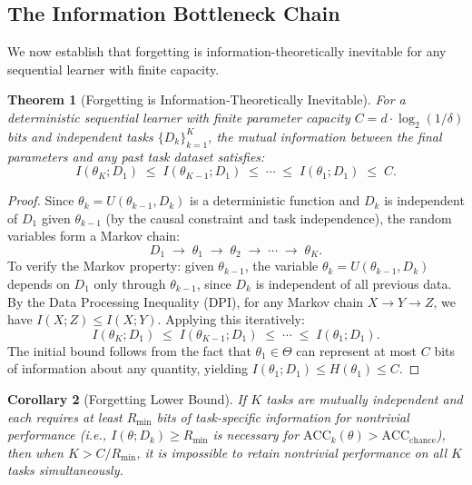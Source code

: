 \documentclass{article}
\newtheorem{theorem}{Theorem}
\newtheorem{corollary}[theorem]{Corollary}
\begin{document}
\subsection{The Information Bottleneck Chain}
\label{sec:bottleneck}

We now establish that forgetting is information-theoretically inevitable for any sequential learner with finite capacity.

\begin{theorem}[Forgetting is Information-Theoretically Inevitable]
\label{thm:bottleneck}
For a deterministic sequential learner with finite parameter capacity $C = d \cdot \log_2(1/\delta)$ bits and independent tasks $\{D_k\}_{k=1}^K$, the mutual information between the final parameters and any past task dataset satisfies:
\begin{equation}
\label{eq:dpi_chain}
    I(\theta_K; D_1) \;\leq\; I(\theta_{K-1}; D_1) \;\leq\; \cdots \;\leq\; I(\theta_1; D_1) \;\leq\; C.
\end{equation}
\end{theorem}

\begin{proof}
Since $\theta_k = U(\theta_{k-1}, D_k)$ is a deterministic function and $D_k$ is independent of $D_1$ given $\theta_{k-1}$ (by the causal constraint and task independence), the random variables form a Markov chain:
\begin{equation}
    D_1 \;\to\; \theta_1 \;\to\; \theta_2 \;\to\; \cdots \;\to\; \theta_K.
\end{equation}
To verify the Markov property: given $\theta_{k-1}$, the variable $\theta_k = U(\theta_{k-1}, D_k)$ depends on $D_1$ only through $\theta_{k-1}$, since $D_k$ is independent of all previous data. By the Data Processing Inequality (DPI), for any Markov chain $X \to Y \to Z$, we have $I(X; Z) \leq I(X; Y)$. Applying this iteratively:
\begin{equation}
    I(\theta_K; D_1) \;\leq\; I(\theta_{K-1}; D_1) \;\leq\; \cdots \;\leq\; I(\theta_1; D_1).
\end{equation}
The initial bound follows from the fact that $\theta_1 \in \Theta$ can represent at most $C$ bits of information about any quantity, yielding $I(\theta_1; D_1) \leq H(\theta_1) \leq C$.
\end{proof}

\begin{corollary}[Forgetting Lower Bound]
\label{cor:forgetting_lb}
If $K$ tasks are mutually independent and each requires at least $R_\mathrm{min}$ bits of task-specific information for nontrivial performance (i.e., $I(\theta; D_k) \geq R_\mathrm{min}$ is necessary for $\mathrm{ACC}_k(\theta) > \mathrm{ACC}_\mathrm{chance}$), then when $K > C / R_\mathrm{min}$, it is impossible to retain nontrivial performance on all $K$ tasks simultaneously.
\end{corollary}
\end{document}
